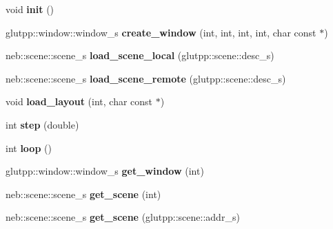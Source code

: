 \begin{DoxyCompactItemize}
\item 
\hypertarget{classneb_1_1app_a32164de189f14d814cfaca3e898b3a7f}{
void {\bfseries init} ()}
\label{classneb_1_1app_a32164de189f14d814cfaca3e898b3a7f}

\item 
\hypertarget{classneb_1_1app_a2e979ae56ad4a9f142816cf4df688907}{
glutpp::window::window\_\-s {\bfseries create\_\-window} (int, int, int, int, char const $\ast$)}
\label{classneb_1_1app_a2e979ae56ad4a9f142816cf4df688907}

\item 
\hypertarget{classneb_1_1app_abb769464af634e2ba8328437e23514f5}{
neb::scene::scene\_\-s {\bfseries load\_\-scene\_\-local} (glutpp::scene::desc\_\-s)}
\label{classneb_1_1app_abb769464af634e2ba8328437e23514f5}

\item 
\hypertarget{classneb_1_1app_a22d8080f269d8980d46eac3c2ce7c506}{
neb::scene::scene\_\-s {\bfseries load\_\-scene\_\-remote} (glutpp::scene::desc\_\-s)}
\label{classneb_1_1app_a22d8080f269d8980d46eac3c2ce7c506}

\item 
\hypertarget{classneb_1_1app_ad0e771e82f86ee786e1b342c18975fd2}{
void {\bfseries load\_\-layout} (int, char const $\ast$)}
\label{classneb_1_1app_ad0e771e82f86ee786e1b342c18975fd2}

\item 
\hypertarget{classneb_1_1app_ae364bf8705edcd0b65375d6831df326f}{
int {\bfseries step} (double)}
\label{classneb_1_1app_ae364bf8705edcd0b65375d6831df326f}

\item 
\hypertarget{classneb_1_1app_a3d1e3aa10f78a8e737352a90c1ff2004}{
int {\bfseries loop} ()}
\label{classneb_1_1app_a3d1e3aa10f78a8e737352a90c1ff2004}

\item 
\hypertarget{classneb_1_1app_a9e1237d528a0bfd338526751bff4a60d}{
glutpp::window::window\_\-s {\bfseries get\_\-window} (int)}
\label{classneb_1_1app_a9e1237d528a0bfd338526751bff4a60d}

\item 
\hypertarget{classneb_1_1app_a862cf4660c0ea97c1097414e2797e73f}{
neb::scene::scene\_\-s {\bfseries get\_\-scene} (int)}
\label{classneb_1_1app_a862cf4660c0ea97c1097414e2797e73f}

\item 
\hypertarget{classneb_1_1app_af87093d040035ac5d0d85dc5b11e0c0a}{
neb::scene::scene\_\-s {\bfseries get\_\-scene} (glutpp::scene::addr\_\-s)}
\label{classneb_1_1app_af87093d040035ac5d0d85dc5b11e0c0a}


\end{DoxyCompactItemize}
